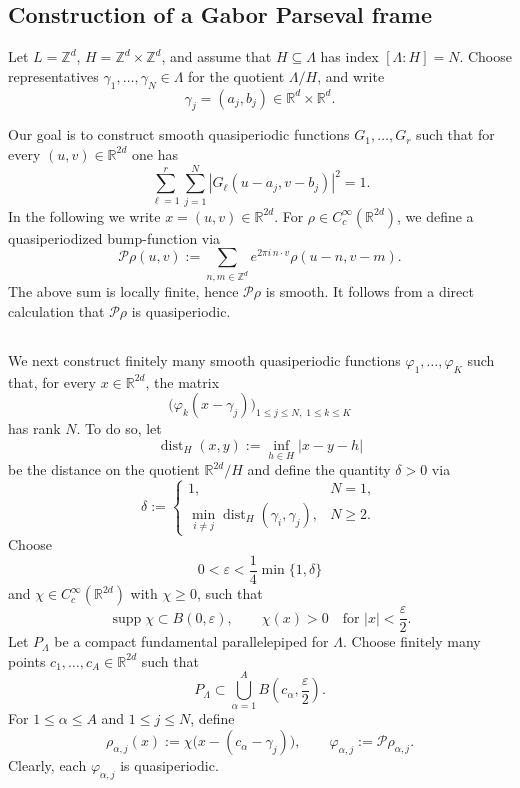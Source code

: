 \documentclass[reqno,a4paper,12pt]{amsart}
\numberwithin{equation}{section}
\newcommand\1{\mathds{1}}
\begin{document}
\subsection{Construction of a Gabor Parseval frame}\label{sec:construction}
Let $L=\mathbb Z^d$, $H=\mathbb Z^d\times\mathbb Z^d$, and assume that $H\subseteq \Lambda$ has index $[\Lambda:H]=N$.
Choose representatives
$
\gamma_1,\dots,\gamma_N\in\Lambda
$
for the quotient $\Lambda/H$, and write
$$
\gamma_j=(a_j,b_j)\in\mathbb R^d\times\mathbb R^d.
$$

Our goal is to construct smooth quasiperiodic functions
$
G_1,\dots,G_r
$
such that
for every $(u,v)\in\mathbb R^{2d}$ one has
\begin{equation}\label{eq:zak-partition-identity}
\sum_{\ell=1}^r\sum_{j=1}^N
|G_\ell(u-a_j,v-b_j)|^2
=
1.
\end{equation}
In the following we write $x=(u,v)\in\mathbb R^{2d}$. For
$\rho\in C_c^\infty(\mathbb R^{2d})$, we define a quasiperiodized bump-function via
\begin{equation}\label{eq:quasi-periodization}
    \mathcal P\rho(u,v)
:=
\sum_{n,m\in\mathbb Z^d}
e^{2\pi i\,n\cdot v}\rho(u-n,v-m).
\end{equation}
The above sum is locally finite, hence $\mathcal P\rho$ is smooth. It follows from a direct calculation that $\mathcal P\rho$ is quasiperiodic.

\subsection{}
We next construct finitely many smooth quasiperiodic functions
$
\varphi_1,\dots,\varphi_K
$
such that, for every $x\in\mathbb R^{2d}$, the matrix
\begin{equation}\label{eq:evaluation-matrix}
    \bigl(\varphi_k(x-\gamma_j)\bigr)_
{1\le j\le N,\;1\le k\le K}
\end{equation}
has rank $N$.
To do so, let
$$
\operatorname{dist}_H(x,y)
:=
\inf_{h\in H}|x-y-h|
$$
be the distance on the quotient $\mathbb R^{2d}/H$ and define the quantity $\delta>0$ via
$$
\delta :=
\begin{cases}
1, & N=1,\\
\min_{i\neq j}\operatorname{dist}_H(\gamma_i,\gamma_j), & N\geq 2.
\end{cases}
$$
Choose
$$
0<\varepsilon<\frac14\min\{1,\delta\}
$$
and $\chi\in C_c^\infty(\mathbb R^{2d})$ with $\chi\geq 0$, such that
$$
\operatorname{supp}\chi\subset B(0,\varepsilon),
\qquad
\chi(x)>0
\quad\text{for } |x|<\frac{\varepsilon}{2}.
$$
Let $P_\Lambda$ be a compact fundamental parallelepiped for $\Lambda$.
Choose finitely many points $c_1,\dots,c_A\in\mathbb R^{2d}$ such that
$$
P_\Lambda
\subset
\bigcup_{\alpha=1}^A
B\left(c_\alpha,\frac{\varepsilon}{2}\right).
$$
For $1\leq\alpha\leq A$ and $1\leq j\leq N$, define
$$
\rho_{\alpha,j}(x)
:=
\chi\bigl(x-(c_\alpha-\gamma_j)\bigr),
\qquad
\varphi_{\alpha,j}:=\mathcal P\rho_{\alpha,j}.
$$
Clearly, each $\varphi_{\alpha,j}$ is quasiperiodic.
\end{document}
